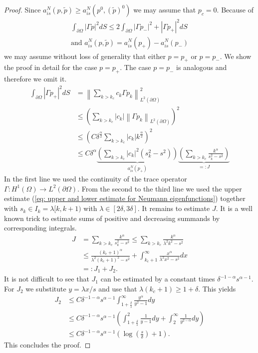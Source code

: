\documentclass{amsart}
\newcommand{\abs}[1]{\left|#1\right|}
\newcommand{\norm}[1]{\left\| #1 \right\|}
\newcommand{\ptilde}{\tilde{p}}
\begin{document}
\begin{proof}
 Since $a^N_{is}(p,\ptilde)\geq a^N_{is}(p^0,(\ptilde)^0)$ we may assume that $p_c=0$. Because of 
 \begin{align*}
  \int_{\partial\Omega} \abs{\Gamma p}^2 dS \leq 2 \int_{\partial\Omega} \abs{\Gamma p_-}^2 + \abs{\Gamma p_+}^2 dS \\
  \text{and } a^N_{is}(p,\ptilde) = a^N_{is}(p_+) - a^N_{is}(p_-)
 \end{align*}
 we may assume without loss of generality that either $p=p_+$ or $p=p_-$. We show the proof in detail for the case $p=p_+$. The case $p=p_-$ is analogous and therefore we omit it. 
 \begin{align*}
  \int_{\partial\Omega} \abs{\Gamma p_+}^2 dS &= \norm{\sum_{k>k_c} c_k \Gamma p_k}_{L^2(\partial\Omega)}^2 \\
  &\leq \left(\sum_{k>k_c} \abs{c_k}\norm{\Gamma p_k}_{L^2(\partial\Omega)}\right)^2 \\
  &\leq \left(C\delta^{\frac{\alpha}{2}} \sum_{k>k_c} \abs{c_k} k^{\frac{\alpha}{2}}\right)^2 \\
  &\leq C\delta^{\alpha} \underbrace{\left(\sum_{k>k_c}\abs{c_k}^2(s_k^2-s^2)\right)}_{a^N_{is}(p_+)}
                         \underbrace{\left(\sum_{k>k_c}\frac{k^{\alpha}}{s_k^2 - s^2}\right)}_{=:J}
 \end{align*}
In the first line we used the continuity of the trace operator $\Gamma: H^1(\Omega)\rightarrow L^2(\partial\Omega)$. From the second to the third line we used the upper estimate (\ref{eq: upper and lower estimate for Neumann eigenfunctions}) together with $s_k\in I_k = \lambda[k,k+1)$ with $\lambda\in[2\delta,3\delta]$. It remains to estimate $J$. It is a well known trick to estimate sums of positive and decreasing summands by corresponding integrals.
\begin{align*}
 J &= \sum_{k>k_c} \frac{k^{\alpha}}{s_k^2 - s^2} \leq \sum_{k>k_c} \frac{k^{\alpha}}{\lambda^2k^2 - s^2} \\
 &\leq \frac{(k_c+1)^{\alpha}}{\lambda^2(k_c+1)^2-s^2} + \int_{k_c+1}^{\infty} \frac{x^{\alpha}}{\lambda^2x^2 - s^2} dx \\
 &=: J_1 + J_2 .
\end{align*}
It is not difficult to see that $J_1$ can be estimated by a constant times $\delta^{-1-\alpha}s^{\alpha-1}$. For $J_2$ we substitute $y=\lambda x/s$ and use that $\lambda(k_c+1)\geq1+\delta$. This yields
\begin{align*}
 J_2 &\leq C\delta^{-1-\alpha}s^{\alpha-1}\int_{1+\frac{\delta}{s}}^{\infty} \frac{y^{\alpha}}{y^2 - 1} dy \\
 &\leq C\delta^{-1-\alpha}s^{\alpha-1}\left(\int_{1+\frac{\delta}{s}}^{2} \frac{1}{y - 1} dy + \int_{2}^{\infty} \frac{1}{y^{2-\alpha}} dy\right) \\
 &\leq C \delta^{-1-\alpha}s^{\alpha-1}(\log(\frac{s}{\delta})+1) .
\end{align*}
This concludes the proof.
\end{proof}
\end{document}
